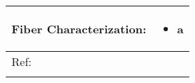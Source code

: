 \begin{table}[th]
\begin{center}
\begin{tabular}{
>{\raggedright\arraybackslash}p{}
>{\raggedright\arraybackslash}p{} }
\hline
Fiber Characterization: &
\begin{itemize}[leftmargin=*]
\item a
\end{itemize} \\

\hline
Ref: & \cite{Liu2014} \\ %
\arrayrulecolor{black}\hline
\label{tbl:FloresCompare}
\end{tabular}
\end{center}
\end{table}

\cite{Min2013}     \\ %
